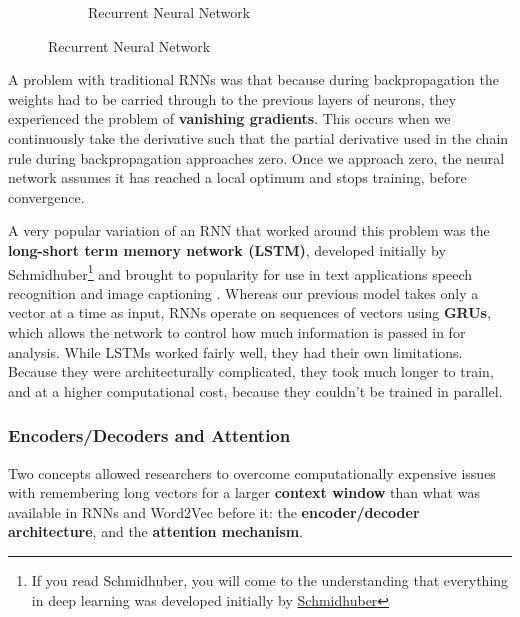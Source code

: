 \documentclass[11pt, table]{diazessay} %
\begin{document}
\begin{sloppypar}
\begin{figure}[H]
\begin{subfigure}[b]{0.4\linewidth}
\caption{Recurrent Neural Network}
\end{subfigure}
\end{figure}

A problem with traditional RNNs was that because during backpropagation the weights had to be carried through to the previous layers of neurons, they experienced the problem of \textbf{vanishing gradients}. This occurs when we continuously take the derivative such that the partial derivative used in the chain rule during backpropagation approaches zero. Once we approach zero, the neural network assumes it has reached a local optimum and stops training, before convergence.

A very popular variation of an RNN that worked around this problem was the \textbf{long-short term memory network (LSTM)}, developed initially by Schmidhuber\footnote{If you read Schmidhuber, you will come to the understanding that everything in deep learning was developed initially by \href{https://people.idsia.ch/~juergen/deep-learning-miraculous-year-1990-1991.html}{Schmidhuber}} and brought to popularity for use in text applications speech recognition and image captioning \citep{karpathy_2015}.  Whereas our previous model takes only a vector at a time as input, RNNs operate on sequences of vectors using \textbf{GRUs}, which allows the network to control how much information is passed in for analysis. While LSTMs worked fairly well, they had their own limitations. Because they were architecturally complicated, they took much longer to train, and at a higher computational cost, because they couldn't be trained in parallel.

\subsubsection{Encoders/Decoders and Attention}
Two concepts allowed researchers to overcome computationally expensive issues with remembering long vectors for a larger \textbf{context window} than what was available in RNNs and Word2Vec before it: the \textbf{encoder/decoder architecture}, and the \textbf{attention mechanism}.


\end{sloppypar}
\end{document}
